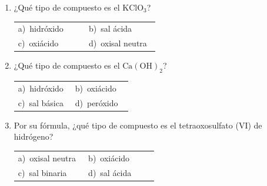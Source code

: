 \documentclass[11pt,a4paper]{article}
\begin{document}
\begin{enumerate}[label=\textbf{\arabic*.},leftmargin=*,itemsep=11pt,topsep=0pt]
\item \begin{minipage}[t]{\linewidth}
¿Qué tipo de compuesto es el $\mathrm{KClO_{3}}$?

\vspace{5pt}
\begin{tabular}{@{}p{0.47\linewidth}p{0.47\linewidth}@{}}
a)~hidróxido & b)~sal ácida \\
c)~oxiácido & d)~oxisal neutra \\
\end{tabular}
\end{minipage}

\item \begin{minipage}[t]{\linewidth}
¿Qué tipo de compuesto es el $\mathrm{Ca(OH)_{2}}$?

\vspace{5pt}
\begin{tabular}{@{}p{0.47\linewidth}p{0.47\linewidth}@{}}
a)~hidróxido & b)~oxiácido \\
c)~sal básica & d)~peróxido \\
\end{tabular}
\end{minipage}

\item \begin{minipage}[t]{\linewidth}
Por su fórmula, ¿qué tipo de compuesto es el tetraoxosulfato (VI) de hidrógeno?

\vspace{5pt}
\begin{tabular}{@{}p{0.47\linewidth}p{0.47\linewidth}@{}}
a)~oxisal neutra & b)~oxiácido \\
c)~sal binaria & d)~sal ácida \\
\end{tabular}
\end{minipage}

\end{enumerate}
\end{document}
